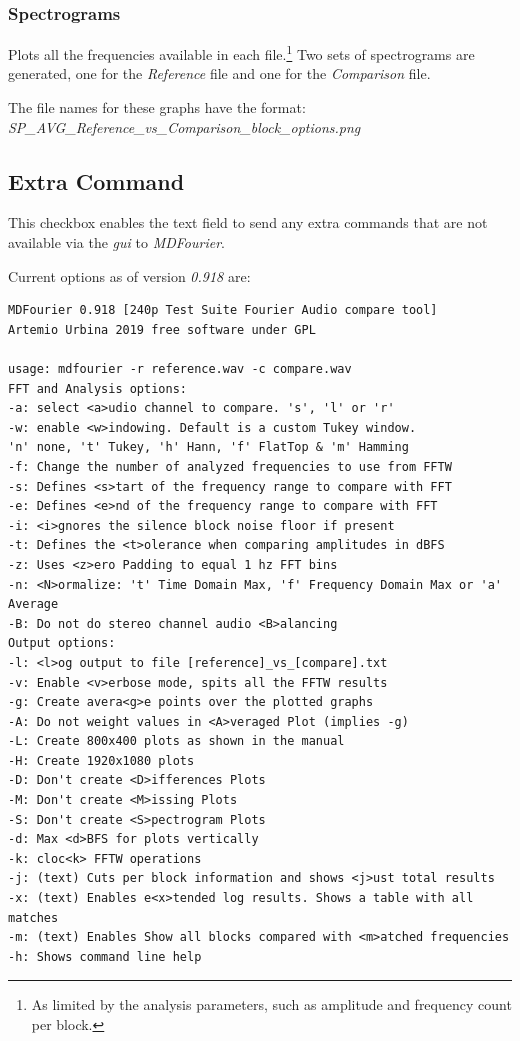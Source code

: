 \documentclass[10pt,a4paper]{report}
\newcommand{\ac}[1]{\textit{\mbox{\acrshort{#1}}}}
\begin{document}
\begin{appendices}
\subsubsection{Spectrograms}

Plots all the frequencies available in each file.\footnote{As limited by the analysis parameters, such as amplitude and frequency count per block.} Two sets of spectrograms are generated, one for the \textit{Reference} file and one for the \textit{Comparison} file.

The file names for these graphs have the format:\\ \textit{SP\_AVG\_Reference\_vs\_Comparison\_block\_options.png}

\subsection{Extra Command}
\label{extracommand}

This checkbox enables the text field to send any extra commands that are not available via the \ac{gui} to \textit{MDFourier}. 

Current options as of version \textit{0.918} are:

\begin{verbatim}
MDFourier 0.918 [240p Test Suite Fourier Audio compare tool]
Artemio Urbina 2019 free software under GPL

usage: mdfourier -r reference.wav -c compare.wav
FFT and Analysis options:
-a: select <a>udio channel to compare. 's', 'l' or 'r'
-w: enable <w>indowing. Default is a custom Tukey window.
'n' none, 't' Tukey, 'h' Hann, 'f' FlatTop & 'm' Hamming
-f: Change the number of analyzed frequencies to use from FFTW
-s: Defines <s>tart of the frequency range to compare with FFT
-e: Defines <e>nd of the frequency range to compare with FFT
-i: <i>gnores the silence block noise floor if present
-t: Defines the <t>olerance when comparing amplitudes in dBFS
-z: Uses <z>ero Padding to equal 1 hz FFT bins
-n: <N>ormalize: 't' Time Domain Max, 'f' Frequency Domain Max or 'a' Average
-B: Do not do stereo channel audio <B>alancing
Output options:
-l: <l>og output to file [reference]_vs_[compare].txt
-v: Enable <v>erbose mode, spits all the FFTW results
-g: Create avera<g>e points over the plotted graphs
-A: Do not weight values in <A>veraged Plot (implies -g)
-L: Create 800x400 plots as shown in the manual
-H: Create 1920x1080 plots
-D: Don't create <D>ifferences Plots
-M: Don't create <M>issing Plots
-S: Don't create <S>pectrogram Plots
-d: Max <d>BFS for plots vertically
-k: cloc<k> FFTW operations
-j: (text) Cuts per block information and shows <j>ust total results
-x: (text) Enables e<x>tended log results. Shows a table with all matches
-m: (text) Enables Show all blocks compared with <m>atched frequencies
-h: Shows command line help
\end{verbatim}


\end{appendices}
\end{document}
